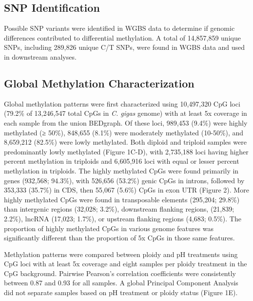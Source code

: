 \documentclass [11pt, proquest] {uwthesis}[2015/03/03]
\begin{document}
\hypertarget{snp-identification-3}{%
\subsection{SNP Identification}\label{snp-identification-3}}

Possible SNP variants were identified in WGBS data to determine if genomic differences contributed to differential methylation. A total of 14,857,859 unique SNPs, including 289,826 unique C/T SNPs, were found in WGBS data and used in downstream analyses.

\hypertarget{global-methylation-characterization-2}{%
\subsection{Global Methylation Characterization}\label{global-methylation-characterization-2}}

Global methylation patterns were first characterized using 10,497,320 CpG loci (79.2\% of 13,246,547 total CpGs in \emph{C. gigas} genome) with at least 5x coverage in each sample from the union BEDgraph. Of these loci, 989,453 (9.4\%) were highly methylated (≥ 50\%), 848,655 (8.1\%) were moderately methylated (10-50\%), and 8,659,212 (82.5\%) were lowly methylated. Both diploid and triploid samples were predominantly lowly methylated (Figure 1C-D), with 2,735,188 loci having higher percent methylation in triploids and 6,605,916 loci with equal or lesser percent methylation in triploids. The highly methylated CpGs were found primarily in genes (932,568; 94.3\%), with 526,656 (53.2\%) genic CpGs in introns, followed by 353,333 (35.7\%) in CDS, then 55,067 (5.6\%) CpGs in exon UTR (Figure 2). More highly methylated CpGs were found in transposable elements (295,204; 29.8\%) than intergenic regions (32,028; 3.2\%), downstream flanking regions, (21,839; 2.2\%), lncRNA (17,023; 1.7\%), or upstream flanking regions (4,683; 0.5\%). The proportion of highly methylated CpGs in various genome features was significantly different than the proportion of 5x CpGs in those same features.

Methylation patterns were compared between ploidy and pH treatments using CpG loci with at least 5x coverage and eight samples per ploidy treatment in the CpG background. Pairwise Pearson's correlation coefficients were consistently between 0.87 and 0.93 for all samples. A global Principal Component Analysis did not separate samples based on pH treatment or ploidy status (Figure 1E).
\end{document}
